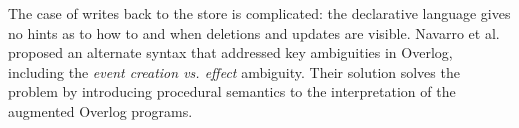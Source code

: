 The case of writes back to the store is complicated: the declarative language gives no hints as to how to and when deletions and updates
are visible.  Navarro et al.~\cite{navarro} proposed an alternate syntax that addressed key ambiguities in Overlog, including the
\emph{event creation vs. effect} ambiguity.  Their solution solves the problem by introducing procedural semantics to the interpretation of 
the augmented Overlog programs.
